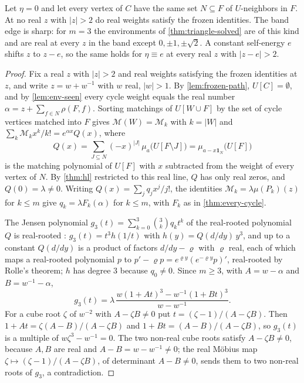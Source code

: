 \documentclass[final]{siamart0516}
\numberwithin{theorem}{section}
\numberwithin{equation}{section}
\theoremstyle{siamnonum}
\theoremstyle{plain}
\newcommand{\Mpot}{\mathcal{M}}           %
\newcommand{\one}{\mathbf{1}}
\begin{document}
\begin{theorem}\label{thm:meanfield}
Let $\eta=0$ and let every vertex of $C$ have the same set $N\subseteq F$ of $U$-neighbors in $F$. At no real $z$ with $|z|>2$ do real weights satisfy the frozen identities. The band edge is sharp: for $m=3$ the environments of \cref{thm:triangle-solved} are of this kind and are real at every $z$ in the band except $0,\pm1,\pm\sqrt2$. A constant self-energy $e$ shifts $z$ to $z-e$, so the same holds for $\eta\equiv e$ at every real $z$ with $|z-e|>2$.
\end{theorem}
\begin{proof}
Fix a real $z$ with $|z|>2$ and real weights satisfying the frozen identities at $z$, and write $z=w+w^{-1}$ with $w$ real, $|w|>1$. By \cref{lem:frozen-path}, $U[C]=\emptyset$, and by \cref{lem:env-seen} every cycle weight equals the real number $\alpha=z+\sum_{f\in N}\rho(F,f)$. Sorting matchings of $U[W\cup F]$ by the set of cycle vertices matched into $F$ gives $\Mpot(W)=\Mpot_k$ with $k=|W|$ and $\sum_k\Mpot_kx^{k}/k!=e^{\alpha x}Q(x)$, where
\[
Q(x)=\sum_{J\subseteq N}(-x)^{|J|}\,\mu_a\bigl(U[F\setminus J]\bigr)=\mu_{a-x\one_N}\bigl(U[F]\bigr)
\]
is the matching polynomial of $U[F]$ with $x$ subtracted from the weight of every vertex of $N$. By \cref{thm:hl} restricted to this real line, $Q$ has only real zeros, and $Q(0)=\lambda\neq0$. Writing $Q(x)=\sum_jq_jx^{j}/j!$, the identities $\Mpot_k=\lambda\mu(P_k)(z)$ for $k\le m$ give $q_k=\lambda F_k(\alpha)$ for $k\le m$, with $F_k$ as in \cref{thm:every-cycle}.

The Jensen polynomial $g_3(t)=\sum_{k=0}^{3}\binom3kq_kt^{k}$ of the real-rooted polynomial $Q$ is real-rooted \cite{PolyaSchur}: $g_3(t)=t^{3}h(1/t)$ with $h(y)=Q(d/dy)\,y^{3}$, and up to a constant $Q(d/dy)$ is a product of factors $d/dy-\varrho$ with $\varrho$ real, each of which maps a real-rooted polynomial $p$ to $p'-\varrho p=e^{\varrho y}(e^{-\varrho y}p)'$, real-rooted by Rolle's theorem; $h$ has degree $3$ because $q_0\neq0$. Since $m\ge3$, with $A=w-\alpha$ and $B=w^{-1}-\alpha$,
\[
g_3(t)=\lambda\,\frac{w(1+At)^{3}-w^{-1}(1+Bt)^{3}}{w-w^{-1}}.
\]
For a cube root $\zeta$ of $w^{-2}$ with $A-\zeta B\neq0$ put $t=(\zeta-1)/(A-\zeta B)$. Then $1+At=\zeta(A-B)/(A-\zeta B)$ and $1+Bt=(A-B)/(A-\zeta B)$, so $g_3(t)$ is a multiple of $w\zeta^{3}-w^{-1}=0$. The two non-real cube roots satisfy $A-\zeta B\neq0$, because $A,B$ are real and $A-B=w-w^{-1}\neq0$; the real M\"obius map $\zeta\mapsto(\zeta-1)/(A-\zeta B)$, of determinant $A-B\neq0$, sends them to two non-real roots of $g_3$, a contradiction.
\end{proof}
\end{document}
